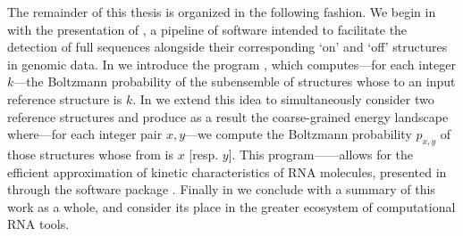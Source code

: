 The remainder of this thesis is organized in the following fashion. We begin in
 with the presentation of \rfinder, a pipeline of
software intended to facilitate the detection of full \rb sequences
alongside their corresponding `on' and `off' structures in genomic data. In
 we introduce the program \fftbor, which computes---for
each integer $k$---the Boltzmann probability \pk of the subensemble of structures
whose \bpd to an input reference structure \str is $k$.
In  we extend this idea to simultaneously consider two
reference structures \strST and produce as a result the coarse-grained \twoD energy
landscape where---for each integer pair $x,y$---we compute the Boltzmann
probability $p_{x,y}$
of those structures whose \bpd from  is $x$
[resp. $y$]. This program---\ffttwo---allows for the efficient approximation of
kinetic characteristics of RNA molecules, presented in 
through the software package \hermes. Finally in  we conclude
with a summary of this work as a whole, and consider its place in the greater
ecosystem of computational RNA tools.

